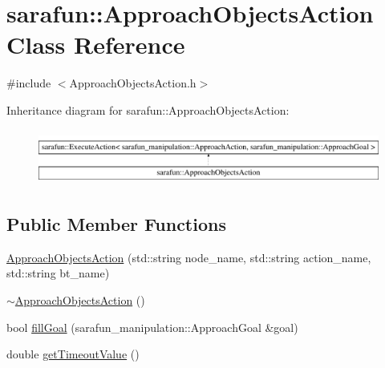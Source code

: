 \hypertarget{classsarafun_1_1ApproachObjectsAction}{\section{sarafun\-:\-:Approach\-Objects\-Action Class Reference}
\label{classsarafun_1_1ApproachObjectsAction}
}


{\ttfamily \#include $<$Approach\-Objects\-Action.\-h$>$}

Inheritance diagram for sarafun\-:\-:Approach\-Objects\-Action\-:\begin{figure}[H]
\begin{center}
\leavevmode
\includegraphics[height=1.839080cm]{classsarafun_1_1ApproachObjectsAction}
\end{center}
\end{figure}
\subsection*{Public Member Functions}
\begin{DoxyCompactItemize}
\item 
\hyperlink{classsarafun_1_1ApproachObjectsAction_ab0d857c262d75eeb85d8dc0e8f746f5f}{Approach\-Objects\-Action} (std\-::string node\-\_\-name, std\-::string action\-\_\-name, std\-::string bt\-\_\-name)
\item 
\hyperlink{classsarafun_1_1ApproachObjectsAction_adb6adaf7dae2e4addf53f47f07afd21e}{$\sim$\-Approach\-Objects\-Action} ()
\item 
bool \hyperlink{classsarafun_1_1ApproachObjectsAction_af5d216551122da780bc550daf4f1dca4}{fill\-Goal} (sarafun\-\_\-manipulation\-::\-Approach\-Goal \&goal)
\item 
double \hyperlink{classsarafun_1_1ApproachObjectsAction_a6852994a6e8a1edf9b2c24c91fd07df2}{get\-Timeout\-Value} ()
\end{DoxyCompactItemize}


